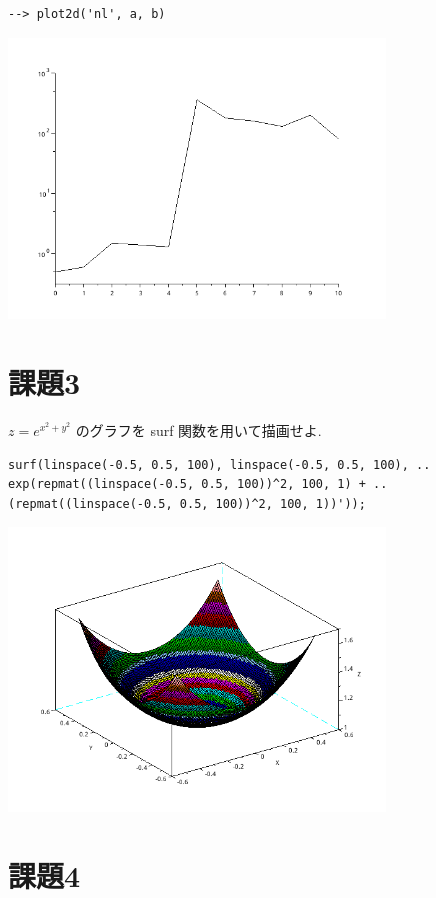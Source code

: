 \documentclass[a4j, 11pt]{jarticle}
\begin{document}
\begin{verbatim}
--> plot2d('nl', a, b)
\end{verbatim}
\begin{center}
\includegraphics[width=10cm]{./2-kata.png}
\end{center}
\section{課題3}
\label{sec:org6492a9e}
\(z = e^{x^2+y^2}\) のグラフを surf 関数を用いて描画せよ.\\
\begin{verbatim}
surf(linspace(-0.5, 0.5, 100), linspace(-0.5, 0.5, 100), ..
exp(repmat((linspace(-0.5, 0.5, 100))^2, 100, 1) + ..
(repmat((linspace(-0.5, 0.5, 100))^2, 100, 1))'));
\end{verbatim}
\begin{center}
\includegraphics[width=10cm]{./3.png}
\end{center}
\section{課題4}
\label{sec:org6799164}
\end{document}
